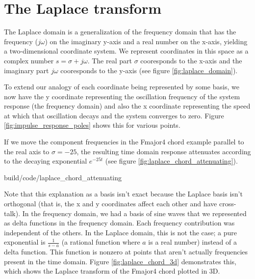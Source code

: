 \section{The Laplace transform}

The Laplace domain is a generalization of the frequency domain that has the
frequency ($j\omega$) on the imaginary y-axis and a real number on the x-axis,
yielding a two-dimensional coordinate system. We represent coordinates in this
space as a complex number $s = \sigma + j\omega$. The real part $\sigma$
cooresponds to the x-axis and the imaginary part $j\omega$ cooresponds to the
y-axis (see figure \ref{fig:laplace_domain}).

\begin{bookfigure}

  \caption{Laplace domain}
  \label{fig:laplace_domain}
\end{bookfigure}

To extend our analogy of each coordinate being represented by some basis, we now
have the y coordinate representing the oscillation frequency of the
\gls{system response} (the frequency domain) and also the x coordinate
representing the speed at which that oscillation decays and the \gls{system}
converges to zero. Figure \ref{fig:impulse_response_poles} shows this for
various points.

If we move the component frequencies in the Fmajor4 chord example parallel to
the real axis to $\sigma = -25$, the resulting time domain response attenuates
according to the decaying exponential $e^{-25t}$ (see figure
\ref{fig:laplace_chord_attenuating}).

\begin{svg}{build/code/laplace_chord_attenuating}
  \caption{Fmajor4 chord at $\sigma = 0$ and $\sigma = -25$}
  \label{fig:laplace_chord_attenuating}
\end{svg}

Note that this explanation as a basis isn't exact because the Laplace basis
isn't orthogonal (that is, the x and y coordinates affect each other and have
cross-talk). In the frequency domain, we had a basis of sine waves that we
represented as delta functions in the frequency domain. Each frequency
contribution was independent of the others. In the Laplace domain, this is not
the case; a pure exponential is $\frac{1}{s - a}$ (a rational function where $a$
is a real number) instead of a delta function. This function is nonzero at
points that aren't actually frequencies present in the time domain. Figure
\ref{fig:laplace_chord_3d} demonstrates this, which shows the Laplace transform
of the Fmajor4 chord plotted in 3D.

